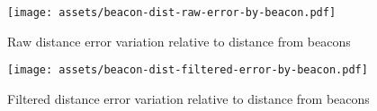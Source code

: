\begin{figure}[h]
    \centering
    \texttt{[image: assets/beacon-dist-raw-error-by-beacon.pdf]}
    \caption{Raw distance error variation relative to distance from beacons}
    \label{fig:beacon-dist-raw-error}
\end{figure}

\begin{figure}[h]
    \centering
    \texttt{[image: assets/beacon-dist-filtered-error-by-beacon.pdf]}
    \caption{Filtered distance error variation relative to distance from beacons}
    \label{fig:beacon-dist-filtered-error}
\end{figure}